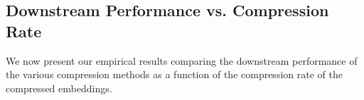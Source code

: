 


\subsection{Downstream Performance vs. Compression Rate}
\label{sec:perf_comp}

We now present our empirical results comparing the downstream performance of the various compression methods as a function of the compression rate of the compressed embeddings.


